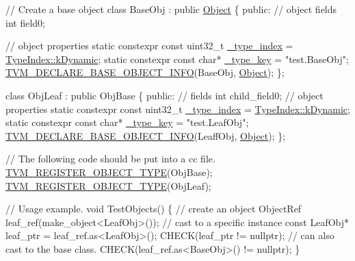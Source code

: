 \begin{DoxyCode}
\textcolor{comment}{// Create a base object}
\textcolor{keyword}{class }BaseObj : \textcolor{keyword}{public} \hyperlink{classtvm_1_1runtime_1_1Object_a133436a9ec5c4a768b94102bf95a660b}{Object} \{
 \textcolor{keyword}{public}:
  \textcolor{comment}{// object fields}
  \textcolor{keywordtype}{int} field0;

  \textcolor{comment}{// object properties}
  \textcolor{keyword}{static} constexpr \textcolor{keyword}{const} uint32\_t \hyperlink{classtvm_1_1runtime_1_1Object_af6aed95d70af7e44ce376a8d7be6c5f1}{\_type\_index} = \hyperlink{namespacetvm_1_1runtime_a7d395cd724f727e86358b73b5cdeb4e4a633f5947b3a79c577b538cec7528f5aa}{TypeIndex::kDynamic};
  \textcolor{keyword}{static} constexpr \textcolor{keyword}{const} \textcolor{keywordtype}{char}* \hyperlink{classtvm_1_1runtime_1_1Object_a43d6bf3191bebb805eced0744d859c1e}{\_type\_key} = \textcolor{stringliteral}{"test.BaseObj"};
  \hyperlink{object_8h_ac2b7418e9549512b5db0126cf2a716f1}{TVM\_DECLARE\_BASE\_OBJECT\_INFO}(BaseObj, \hyperlink{classtvm_1_1runtime_1_1Object_a133436a9ec5c4a768b94102bf95a660b}{Object});
\};

\textcolor{keyword}{class }ObjLeaf : \textcolor{keyword}{public} ObjBase \{
 \textcolor{keyword}{public}:
  \textcolor{comment}{// fields}
  \textcolor{keywordtype}{int} child\_field0;
  \textcolor{comment}{// object properties}
  \textcolor{keyword}{static} constexpr \textcolor{keyword}{const} uint32\_t \hyperlink{classtvm_1_1runtime_1_1Object_af6aed95d70af7e44ce376a8d7be6c5f1}{\_type\_index} = \hyperlink{namespacetvm_1_1runtime_a7d395cd724f727e86358b73b5cdeb4e4a633f5947b3a79c577b538cec7528f5aa}{TypeIndex::kDynamic};
  \textcolor{keyword}{static} constexpr \textcolor{keyword}{const} \textcolor{keywordtype}{char}* \hyperlink{classtvm_1_1runtime_1_1Object_a43d6bf3191bebb805eced0744d859c1e}{\_type\_key} = \textcolor{stringliteral}{"test.LeafObj"};
  \hyperlink{object_8h_ac2b7418e9549512b5db0126cf2a716f1}{TVM\_DECLARE\_BASE\_OBJECT\_INFO}(LeaffObj, \hyperlink{classtvm_1_1runtime_1_1Object_a133436a9ec5c4a768b94102bf95a660b}{Object});
\};

\textcolor{comment}{// The following code should be put into a cc file.}
\hyperlink{object_8h_ae1029068e5e7608770038906ca30db09}{TVM\_REGISTER\_OBJECT\_TYPE}(ObjBase);
\hyperlink{object_8h_ae1029068e5e7608770038906ca30db09}{TVM\_REGISTER\_OBJECT\_TYPE}(ObjLeaf);

\textcolor{comment}{// Usage example.}
\textcolor{keywordtype}{void} TestObjects() \{
  \textcolor{comment}{// create an object}
  ObjectRef leaf\_ref(make\_object<LeafObj>());
  \textcolor{comment}{// cast to a specific instance}
  \textcolor{keyword}{const} LeafObj* leaf\_ptr = leaf\_ref.as<LeafObj>();
  CHECK(leaf\_ptr != \textcolor{keyword}{nullptr});
  \textcolor{comment}{// can also cast to the base class.}
  CHECK(leaf\_ref.as<BaseObj>() != \textcolor{keyword}{nullptr});
\}
\end{DoxyCode}
 

